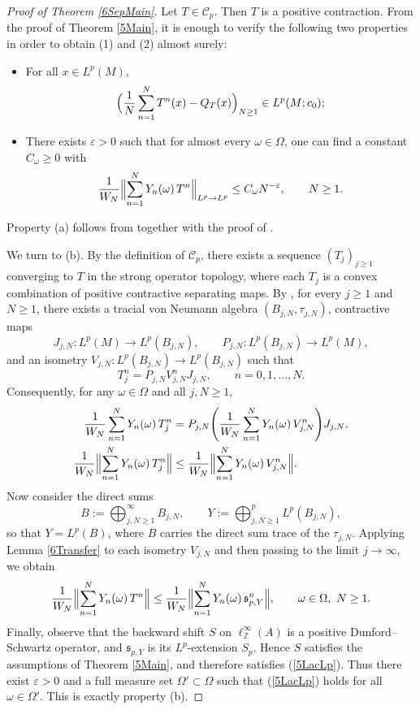 \documentclass[12pt]{amsart}
\newcommand{\C}{\mbox{${\mathcal C}$}}
\newcommand{\Bignorm}[1]{\Bigl\Vert#1\Bigr\Vert}
\theoremstyle{remark}
\theoremstyle{definition}
\numberwithin{equation}{section}
\begin{document}
\begin{proof}[Proof of Theorem \ref{6SepMain}]
Let $T \in \C_p$. Then $T$ is a positive contraction. 
From the proof of Theorem \ref{5Main}, it is enough to verify the following two properties in order to obtain (1) and (2) almost surely:

\begin{itemize}
\item[(a)] For all $x \in L^p(M)$,
$$
\Bigl(\frac{1}{N}\sum_{n=1}^N T^n(x) - Q_T(x)\Bigr)_{N \ge 1} \in L^p(M; c_0);
$$

\item[(b)] There exists $\varepsilon > 0$ such that for almost every $\omega \in \Omega$, one can find a constant $C_\omega \ge 0$ with
$$
\frac{1}{W_N} \Bignorm{\sum_{n=1}^N Y_n(\omega)\, T^n}_{L^p \to L^p} \le C_\omega N^{-\varepsilon}, 
\qquad N \ge 1.
$$
\end{itemize}

Property (a) follows from \cite[Theorem 1.3]{HRW} together with the proof of \cite[Theorem 6.3]{JX}.

We turn to (b). By the definition of $\C_p$, there exists a sequence $(T_j)_{j \ge 1}$ converging to $T$ in the strong operator topology, where each $T_j$ is a convex combination of positive contractive separating maps. By \cite[Corollary 4.7]{HRW}, for every $j \ge 1$ and $N \ge 1$, there exists a tracial von Neumann algebra $(B_{j,N}, \tau_{j,N})$, contractive maps
$$
J_{j,N}\colon L^p(M) \to L^p(B_{j,N}), \qquad
P_{j,N}\colon L^p(B_{j,N}) \to L^p(M),
$$
and an isometry $V_{j,N}\colon L^p(B_{j,N}) \to L^p(B_{j,N})$ such that
$$
T_j^n = P_{j,N} V_{j,N}^n J_{j,N}, \qquad n = 0,1,\dots,N.
$$
Consequently, for any $\omega \in \Omega$ and all $j,N \ge 1$,
\begin{align*}
\frac{1}{W_N} \sum_{n=1}^N Y_n(\omega)\, T_j^n 
&= P_{j,N} \Biggl(\frac{1}{W_N} \sum_{n=1}^N Y_n(\omega)\, V_{j,N}^n\Biggr) J_{j,N},\\
\frac{1}{W_N} \Bignorm{\sum_{n=1}^N Y_n(\omega)\, T_j^n} 
&\le \frac{1}{W_N} \Bignorm{\sum_{n=1}^N Y_n(\omega)\, V_{j,N}^n}.
\end{align*}
Now consider the direct sums
$$
B := \bigoplus_{j,N \ge 1}^\infty B_{j,N}, \qquad
Y := \bigoplus_{j,N \ge 1}^p L^p(B_{j,N}),
$$
so that $Y = L^p(B)$, where $B$ carries the direct sum trace of the $\tau_{j,N}$. Applying Lemma \ref{6Transfer} to each isometry $V_{j,N}$ and then passing to the limit $j \to \infty$, we obtain
$$
\frac{1}{W_N} \Bignorm{\sum_{n=1}^N Y_n(\omega)\, T^n} \le 
\frac{1}{W_N} \Bignorm{\sum_{n=1}^N Y_n(\omega)\, {\mathfrak s}_{p,Y}^n}, 
\qquad \omega \in \Omega,\ N \ge 1.
$$
Finally, observe that the backward shift $S$ on $\ell^\infty_{\mathbb Z}(A)$ is a positive Dunford–Schwartz operator, and ${\mathfrak s}_{p,Y}$ is its $L^p$-extension $S_p$. Hence $S$ satisfies the assumptions of Theorem \ref{5Main}, and therefore satisfies (\ref{5LacLp}). Thus there exist $\varepsilon > 0$ and a full measure set $\Omega' \subset \Omega$ such that (\ref{5LacLp}) holds for all $\omega \in \Omega'$. This is exactly property (b).
\end{proof}
\end{document}
